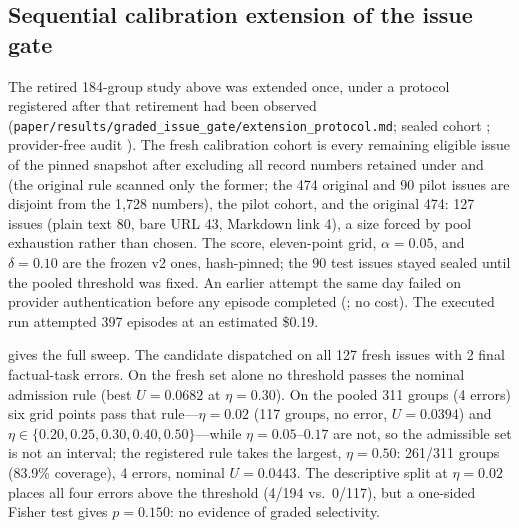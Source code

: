 \subsection{Sequential calibration extension of the issue gate}
\label{app:gate-extension}

The retired 184-group study above was extended once, under a protocol
registered after that retirement had been observed
(\texttt{paper/results/graded\_issue\_gate/}\allowbreak\texttt{extension\_protocol.md}; sealed cohort
; provider-free audit
). The fresh calibration cohort is every remaining
eligible issue of the pinned snapshot after excluding all record numbers
retained under  and  (the original rule
scanned only the former; the 474 original and 90 pilot issues are disjoint from
the 1,728  numbers), the pilot cohort, and the original 474:
127 issues (plain text 80, bare URL 43, Markdown link 4), a size forced by
pool exhaustion rather than chosen. The score, eleven-point grid,
$\alpha=0.05$, and $\delta=0.10$ are the frozen v2 ones, hash-pinned; the 90
test issues stayed sealed until the pooled threshold was fixed. An earlier
attempt the same day failed on provider authentication before any episode
completed (; no cost). The executed run attempted
397 episodes at an estimated \$0.19.

 gives the full sweep. The candidate dispatched on all
127 fresh issues with 2 final factual-task errors. On the fresh set alone no
threshold passes the nominal admission rule (best $U=0.0682$ at $\eta=0.30$).
On the pooled 311 groups (4 errors) six grid points pass that rule---$\eta=0.02$ (117 groups, no
error, $U=0.0394$) and $\eta\in\{0.20,0.25,0.30,0.40,0.50\}$---while
$\eta=0.05$--$0.17$ are not, so the admissible set is not an interval; the
registered rule takes the largest, $\eta=0.50$: 261/311 groups (83.9\%
coverage), 4 errors, nominal $U=0.0443$. The descriptive split at $\eta=0.02$ places
all four errors above the threshold (4/194 vs.\ 0/117), but a one-sided Fisher
test gives $p=0.150$: no evidence of graded selectivity.

